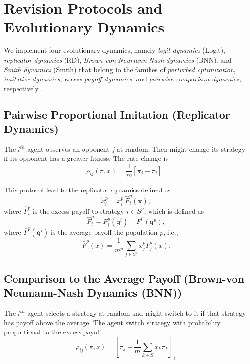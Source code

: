 \documentclass[a4paper,10pt]{article}
\def\th{^{th}}
\newcommand{\bs}[1]{\boldsymbol{#1}}
\begin{document}
 
 
 \section{Revision Protocols and Evolutionary Dynamics}\label{sec:protocols}
 
 
We implement four evolutionary dynamics, namely \emph{logit dynamics} (Logit), \emph{replicator dynamics} (RD), \emph{Brown-von Neumann-Nash dynamics} (BNN), and \emph{Smith dynamics} (Smith) that belong to the families of \emph{perturbed optimization}, \emph{imitative dynamics}, \emph{excess payoff dynamics}, and \emph{pairwise comparison dynamics}, respectively \cite{hofbauer2001nash, sandholm_book}. 
 
 \subsection{Pairwise Proportional Imitation (Replicator Dynamics)}

The $i\th$ agent observes an opponent $j$ at random. Then might change its strategy if  its opponent has a greater fitness. The rate change is 
%
\begin{equation}
\rho_{ij}(\pi, x) = \frac{1}{m} [\pi_j - \pi_i]_+
\end{equation}

This protocol lead to the replicator dynamics defined as
\begin{equation}\label{eq:replicator}
\dot{x}_i^p = x_i^p \, \hat{F}_i^p \left( \bs{x} \right),
\end{equation}
where $\hat{F}_i^p$ is the excess payoff to strategy $i\in S^p$, which is defined as   
\begin{equation}
\hat{F}_i^p =  F_i^p(\bs{q}^i) - \bar{F}^p(\bs{q}^p),
\end{equation}
where $\bar{F}^p(\bs{q}^i)$ is the average payoff the population $p$, i.e., 
\begin{equation}
 \bar{F}^p(x) = \frac{1}{m^p} \sum_{j \in S^p} x_j^p F_j^p(x).
\end{equation}



\subsection{Comparison to the Average Payoff (Brown-von Neumann-Nash Dynamics (BNN))}

The $i\th$ agent selects a strategy at random and might switch to it if that strategy has payoff above the average. The agent switch strategy with probability proportional to the excess payoff
%
\begin{equation}
\rho_{ij}(\pi, x) = \left[ \pi_j - \frac{1}{m} \sum_{k\in S} x_k \pi_k \right]_+
\end{equation}
\end{document}
